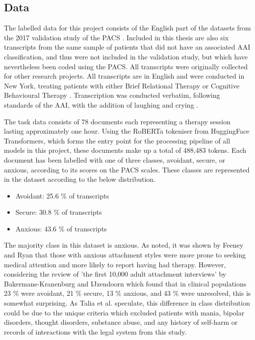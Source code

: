 \documentclass[12pt]{report}
\begin{document}
\subsection{Data}
The labelled data for this project consists of the English part of the datasets from the 2017 validation study of the PACS \cite{Talia2017}.
Included in this thesis are also six transcripts from the same sample of patients that did not have an associated AAI classification, and thus were not included in the validation study, but which have nevertheless been coded using the PACS.
All transcripts were originally collected for other research projects.
All transcripts are in English and were conducted in New York, treating patients with either Brief Relational Therapy \cite{Safran2000} or Cognitive Behavioural Therapy \cite{Beck2011}.
Transcription was conducted verbatim, following standards of the AAI, with the addition of laughing and crying \cite{Talia2017, Talia2014}.

The task data consists of 78 documents each representing a therapy session lasting approximately one hour.
Using the RoBERTa tokeniser from HuggingFace Transformers, which forms the entry point for the processing pipeline of all models in this project, these documents make up a total of 488,483 tokens.
Each document has been labelled with one of three classes, avoidant, secure, or anxious, according to its scores on the PACS scales.
These classes are represented in the dataset according to the below distribution.
\begin{itemize}
    \item {Avoidant: 25.6 \% of transcripts}
    \item {Secure: 30.8 \% of transcripts}
    \item {Anxious: 43.6 \% of transcripts}
\end{itemize}
The majority class in this dataset is anxious.
As noted, it was shown by Feeney and Ryan \citeyear{Feeney1994} that those with anxious attachment styles were more prone to seeking medical attention and more likely to report having had therapy.
However, considering the review of 'the first 10,000 adult attachment interviews' by Bakermans-Kranenburg and IJzendoorn \citeyear{Bakermanskranenburg2009} which found that in clinical populations 23 \% were avoidant, 21 \% secure, 13 \% anxious, and 43 \% were unresolved, this is somewhat surprising.
As Talia et al. \citeyear{Talia2017} speculate, this difference in class distribution could be due to the unique criteria which excluded patients with mania, bipolar disorders, thought disorders, substance abuse, and any history of self-harm or records of interactions with the legal system from this study.
\end{document}
